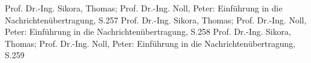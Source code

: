 \begin{thebibliography}{999}
  Prof. Dr.-Ing. Sikora, Thomas; Prof. Dr.-Ing. Noll, Peter: Einführung in die
 Nachrichtenübertragung, S.257
 Prof. Dr.-Ing. Sikora, Thomas; Prof. Dr.-Ing. Noll, Peter: Einführung in die
 Nachrichtenübertragung, S.258
 Prof. Dr.-Ing. Sikora, Thomas; Prof. Dr.-Ing. Noll, Peter: Einführung in die
 Nachrichtenübertragung, S.259
 



\end{thebibliography}


  	    
